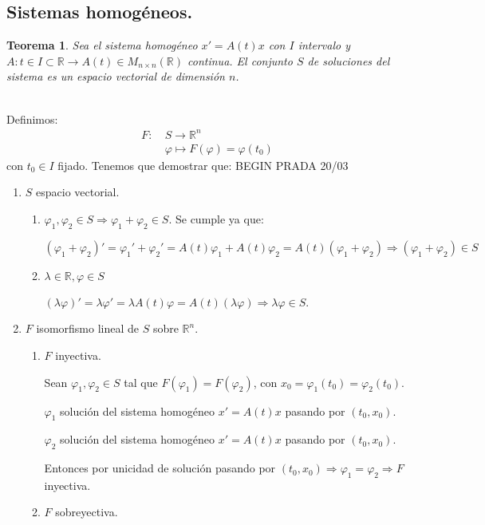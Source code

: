 \documentclass{article}
\makeatletter
\theoremstyle{theorem-style}  %
\newtheorem{theorem}{Teorema}[section]  %
\theoremstyle{definition-style}
\theoremstyle{example-style}
\renewenvironment{proof}[1][\proofname]{\par
	\pushQED{\qed}%
	\normalfont \topsep6\p@\@plus6\p@\relax
	\list{}{%
		\settowidth{\leftmargin}{\quad:\hskip\labelsep}%
		\setlength{\labelwidth}{0pt}%
		\setlength{\itemindent}{-\leftmargin}%
	}%
	\item[\hskip\labelsep\itshape#1\@addpunct{:}]\ignorespaces
}{%
	\popQED\endlist\@endpefalse
}
\makeatother
\begin{document}
\subsection{Sistemas homogéneos.}
\begin{theorem}
	Sea el sistema homogéneo $x' = A(t) x$ con $I$ intervalo y $A: t \in I \subset \mathbb{R} \longrightarrow A(t) \in M_{n \times n} (\mathbb{R})$ continua. El conjunto $S$ de soluciones del sistema es un espacio vectorial de dimensión $n$.
\end{theorem}
\begin{proof}\ \\
	Definimos:
	\begin{align*}
		F : \ &S \longrightarrow \mathbb{R}^n \\
		&\varphi \longmapsto F(\varphi) = \varphi (t_0)
	\end{align*}
	con $t_0 \in I$ fijado. Tenemos que demostrar que:
BEGIN PRADA 20/03
	\begin{enumerate}
		\item $ S $ espacio vectorial. 
		\begin{enumerate}[\quad i)]
			\item $ \varphi_1, \varphi_2 \in S \Rightarrow \varphi_1 + \varphi_2 \in S$. Se cumple ya que:
			
			$ (\varphi_1 + \varphi_2)' =\varphi_1'+\varphi_2'=A(t)\varphi_1 +A(t)\varphi_2 = A(t)(\varphi_1 + \varphi_2)\Rightarrow (\varphi_1+\varphi_2)\in S$
			\item $ \lambda\in \mathbb{R}, \varphi\in S $
			
			$ (\lambda \varphi)'=\lambda \varphi'=\lambda A(t)\varphi=A(t)(\lambda \varphi)\Rightarrow \lambda\varphi\in S $.
		\end{enumerate}
		\item $ F $ isomorfismo lineal de $ S $ sobre $ \mathbb{R}^n $.
		\begin{enumerate}[\quad i)]
			\item $ F $ inyectiva. 
			
			Sean $ \varphi_1,\varphi_2 \in S $ tal que $ F(\varphi_1)=F(\varphi_2) $, con $ x_0=\varphi_1(t_0)=\varphi_2(t_0) $.
			
			$ \varphi_1 $ solución del sistema homogéneo $ x'=A(t)x $ pasando por $ (t_0,x_0) $.
			
			$ \varphi_2 $ solución del sistema homogéneo $ x'=A(t)x $ pasando por $ (t_0,x_0) $.
			
			Entonces por unicidad de solución pasando por $ (t_0,x_0) \Rightarrow \varphi_1=\varphi_2\Rightarrow F$ inyectiva.
			\item $ F $ sobreyectiva. 
			

\end{enumerate}
\end{enumerate}
\end{proof}
\end{document}
